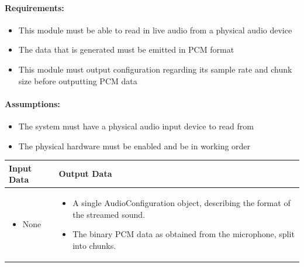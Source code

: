 \documentclass[english,12pt]{scrartcl}
\begin{document}
		\paragraph{Requirements:}
		\begin{itemize}
			\item This module must be able to read in live audio from a physical audio device
			\item The data that is generated must be emitted in PCM format
			\item This module must output configuration regarding its sample rate and chunk size before outputting PCM data
		\end{itemize}
		
		\paragraph{Assumptions:}
		\begin{itemize}
			\item The system must have a physical audio input device to read from
			\item The physical hardware must be enabled and be in working order
		\end{itemize}
		
		\begin{tabular}{p{7cm}|p{7cm}}
    			\textbf{Input Data} & \textbf{Output Data} \\ \hline
			\begin{itemize}
				\item None
			\end{itemize}
			&
			\begin{itemize}
				\item A single AudioConfiguration object, describing the format of the streamed sound.
				\item The binary PCM data as obtained from the microphone, split into chunks.
			\end{itemize}
		\end{tabular}
\end{document}
